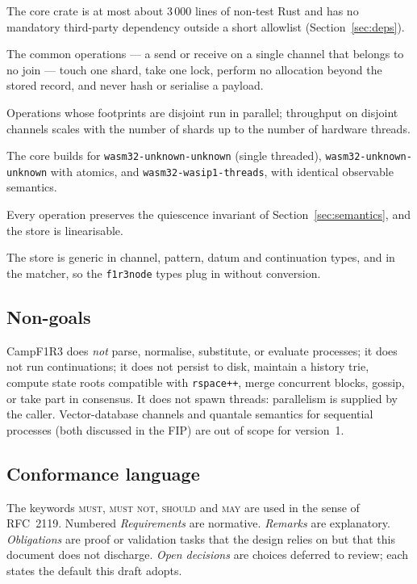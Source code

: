 \documentclass[11pt]{article}
\theoremstyle{plain}
\theoremstyle{definition}
\newcommand{\Camp}{CampF1R3}
\newcommand{\MUST}{\textsc{must}}
\newcommand{\MUSTNOT}{\textsc{must not}}
\newcommand{\SHOULD}{\textsc{should}}
\newcommand{\MAY}{\textsc{may}}
\newcommand{\code}[1]{\texttt{#1}}
\begin{document}
\begin{description}[nosep,leftmargin=2.2em,style=nextline]
\item[G1 Small.] The core crate is at most about 3\,000 lines of non-test Rust
  and has no mandatory third-party dependency outside a short allowlist
  (Section~\ref{sec:deps}).
\item[G2 Fast.] The common operations --- a send or receive on a single channel
  that belongs to no join --- touch one shard, take one lock, perform no
  allocation beyond the stored record, and never hash or serialise a payload.
\item[G3 Multi-threaded.] Operations whose footprints are disjoint run in
  parallel; throughput on disjoint channels scales with the number of shards up to
  the number of hardware threads.
\item[G4 Portable.] The core builds for \code{wasm32-unknown-unknown} (single
  threaded), \code{wasm32-unknown-unknown} with atomics, and
  \code{wasm32-wasip1-threads}, with identical observable semantics.
\item[G5 Conformant.] Every operation preserves the quiescence invariant of
  Section~\ref{sec:semantics}, and the store is linearisable.
\item[G6 Reusable.] The store is generic in channel, pattern, datum and
  continuation types, and in the matcher, so the \code{f1r3node} types plug in
  without conversion.
\end{description}

\subsection{Non-goals}

\Camp{} does \emph{not} parse, normalise, substitute, or evaluate processes; it
does not run continuations; it does not persist to disk, maintain a history trie,
compute state roots compatible with \code{rspace++}, merge concurrent blocks,
gossip, or take part in consensus. It does not spawn threads: parallelism is
supplied by the caller. Vector-database channels and quantale semantics for
sequential processes (both discussed in the FIP) are out of scope for version~1.

\subsection{Conformance language}

The keywords \MUST, \MUSTNOT, \SHOULD{} and \MAY{} are used in the sense of
RFC~2119. Numbered \emph{Requirements} are normative. \emph{Remarks} are
explanatory. \emph{Obligations} are proof or validation tasks that the design
relies on but that this document does not discharge. \emph{Open decisions} are
choices deferred to review; each states the default this draft adopts.
\end{document}
